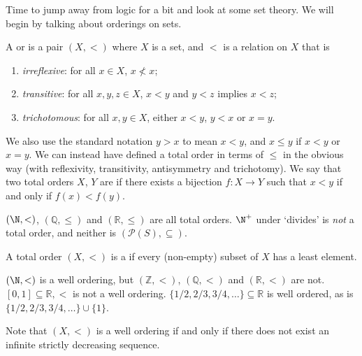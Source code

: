 \documentclass[a4paper]{scrartcl}
\begin{document}
Time to jump away from logic for a bit and look at some set theory. We will begin by talking about orderings on sets.

\begin{definition}
  A  or  is a pair $(X, <)$ where $X$ is a set, and $<$ is a relation on $X$ that is
  \begin{enumerate}[label=(\roman*)]
    \item \emph{irreflexive}: for all $x \in X$, $x \not< x$;
    \item \emph{transitive}: for all $x, y, z \in X$, $x < y$ and $y < z$ implies $x < z$;
    \item \emph{trichotomous}: for all $x, y \in X$, either $x < y$, $y < x$ or $x = y$. 
  \end{enumerate}
\end{definition}

We also use the standard notation $y > x$ to mean $x < y$, and $x \leq y$ if $x < y$ or $x = y$. We can instead have defined a total order in terms of $\leq$ in the obvious way (with reflexivity, transitivity, antisymmetry and trichotomy). We say that two total orders $X$, $Y$ are  if there exists a bijection $f: X \rightarrow Y$ such that $x < y$ if and only if $f(x) < f(y)$.

\begin{example}
  $(\N, <)$, $(\mathbb{Q}, \leq)$ and $(\mathbb{R}, \leq)$ are all total orders. $\N^+$ under `divides' is \emph{not} a total order, and neither is $(\mathcal{P}(S), \subseteq)$.
\end{example}

\begin{definition}
  A total order $(X, <)$ is a  if every (non-empty) subset of $X$ has a least element.
\end{definition}

\begin{example}
$(\N, <)$ is a well ordering, but $(\mathbb{Z}, <)$, $(\mathbb{Q}, <)$ and $(\mathbb{R}, <)$ are not. $[0, 1] \subseteq \mathbb{R}, <$ is not a well ordering. $\{1/2, 2/3, 3/4, \dots \} \subseteq \mathbb{R}$ is well ordered, as is $\{1/2, 2/3, 3/4, \dots \} \cup \{1\}$.
\end{example}

Note that $(X, <)$ is a well ordering if and only if there does not exist an infinite strictly decreasing sequence.
\end{document}

